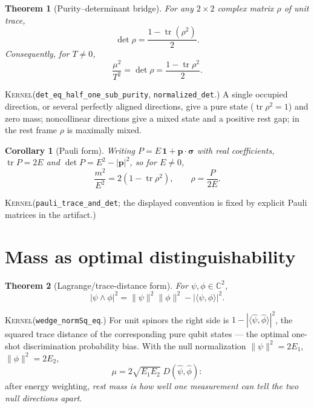 \documentclass[11pt]{article}
\newcommand{\id}{\mathbf{1}}
\newcommand{\C}{\mathbb{C}}
\newcommand{\tr}{\operatorname{tr}}
\newcommand{\Kernel}{\textcolor{kernelcolor}{\textsc{Kernel}}}
\newtheorem{theorem}{Theorem}
\newtheorem{corollary}{Corollary}
\begin{document}
\begin{theorem}[Purity--determinant bridge]\label{thm:purity}
For any $2\times2$ complex matrix $\rho$ of unit trace,
\begin{equation}
 \det\rho=\frac{1-\tr(\rho^2)}{2}.
\end{equation}
Consequently, for $T\neq0$,
\begin{equation}
 \frac{\mu^2}{T^2}
 =\det\rho
 =\frac{1-\tr\rho^2}{2}.
\end{equation}
\end{theorem}
\noindent\Kernel{}\quad(\texttt{det\_eq\_half\_one\_sub\_purity},
\texttt{normalized\_det}.)  A single occupied direction, or several
perfectly aligned directions, give a pure state ($\tr\rho^2=1$) and zero
mass; noncollinear directions give a mixed state and a positive rest gap;
in the rest frame $\rho$ is maximally mixed.

\begin{corollary}[Pauli form]\label{cor:pauli}
Writing $P=E\,\id+\mathbf p\cdot\boldsymbol\sigma$ with real coefficients,
$\tr P=2E$ and $\det P=E^2-|\mathbf p|^2$, so for $E\neq0$,
\begin{equation}
 \frac{m^2}{E^2}=2\left(1-\tr\rho^2\right),
 \qquad \rho=\frac{P}{2E}.
\end{equation}
\end{corollary}
\noindent\Kernel{}\quad(\texttt{pauli\_trace\_and\_det}; the displayed
convention is fixed by explicit Pauli matrices in the artifact.)

\section{Mass as optimal distinguishability}

\begin{theorem}[Lagrange/trace-distance form]\label{thm:distance}
For $\psi,\phi\in\C^2$,
\begin{equation}
 |\psi\wedge\phi|^2
 =\|\psi\|^2\|\phi\|^2-|\langle\psi,\phi\rangle|^2 .
\end{equation}
\end{theorem}
\noindent\Kernel{}\quad(\texttt{wedge\_normSq\_eq}.)  For unit spinors the
right side is $1-|\langle\widehat\psi,\widehat\phi\rangle|^2$, the squared
trace distance of the corresponding pure qubit states --- the optimal
one-shot discrimination probability bias.  With the null normalization
$\|\psi\|^2=2E_1$, $\|\phi\|^2=2E_2$,
\begin{equation}
 \mu=2\sqrt{E_1E_2}\;D(\widehat\psi,\widehat\phi):
\end{equation}
after energy weighting, \emph{rest mass is how well one measurement can
tell the two null directions apart}.
\end{document}
